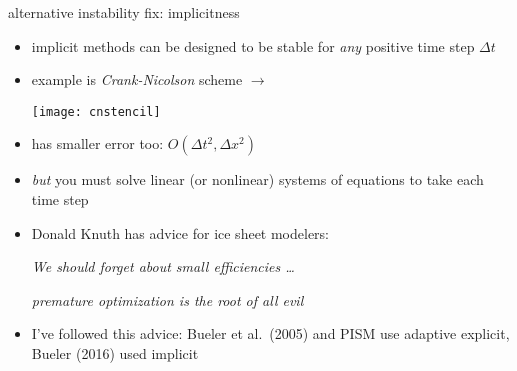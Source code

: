 \begin{frame}{alternative instability fix: implicitness}

\begin{itemize}
\item \alert{implicit} methods can be designed to be stable for \emph{any} positive time step $\Delta t$
\item example is \emph{Crank-Nicolson} scheme $\longrightarrow$

\vspace{-10mm}
\hfill \texttt{[image: cnstencil]}

\vspace{-7mm}
\item has smaller error too: $O(\Delta t^2,\Delta x^2)$
\item \emph{but} you must solve linear (or nonlinear) systems of equations to take each time step

\bigskip

\small
\item Donald Knuth has advice for ice sheet modelers:

\begin{center}
\emph{We should forget about small efficiencies \dots}

\emph{premature optimization is the root of all evil}
\end{center}

\item I've followed this advice: Bueler et al.~(2005) and PISM use adaptive explicit, Bueler (2016) used implicit
\end{itemize}
\end{frame}



